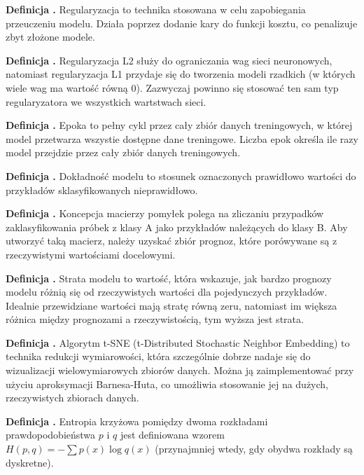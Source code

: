 \noindent
\textbf{Definicja .}
\incrementdefinitionIndex
Regularyzacja to technika stosowana w celu zapobiegania przeuczeniu modelu.
Działa poprzez dodanie kary do funkcji kosztu, co penalizuje zbyt złożone modele.

\noindent
\textbf{Definicja .}
\incrementdefinitionIndex
Regularyzacja L2 służy do ograniczania wag sieci neuronowych,
natomiast regularyzacja L1 przydaje się do tworzenia modeli rzadkich (w których wiele wag ma wartość równą 0). 
Zazwyczaj powinno się stosować ten sam typ regularyzatora we wszystkich wartstwach sieci.

\noindent
\textbf{Definicja .}
\incrementdefinitionIndex
Epoka to pełny cykl przez cały zbiór danych treningowych, w której model przetwarza wszystie dostępne dane treningowe.
Liczba epok określa ile razy model przejdzie przez cały zbiór danych treningowych.

\noindent
\textbf{Definicja .}
\incrementdefinitionIndex
Dokładność modelu to stosunek oznaczonych prawidłowo wartości do przykładów sklasyfikowanych nieprawidłowo.

\noindent
\textbf{Definicja .}
\incrementdefinitionIndex
Koncepcja macierzy pomyłek polega na zliczaniu przypadków zaklasyfikowania próbek z klasy A jako przykładów należących do klasy B.
Aby utworzyć taką macierz, należy uzyskać zbiór prognoz, które porówywane są z rzeczywistymi wartościami docelowymi.

\noindent
\textbf{Definicja .}
\incrementdefinitionIndex
Strata modelu to wartość, która wskazuje,
jak bardzo prognozy modelu różnią się od rzeczywistych wartości dla pojedynczych przykładów.
Idealnie przewidziane wartości mają stratę równą zeru,
natomiast im większa różnica między prognozami a rzeczywistością, tym wyższa jest strata.

\noindent
\textbf{Definicja .}
\incrementdefinitionIndex
Algorytm t-SNE (t-Distributed Stochastic Neighbor Embedding) to technika redukcji wymiarowości,
która szczególnie dobrze nadaje się do wizualizacji wielowymiarowych zbiorów danych.
Można ją zaimplementować przy użyciu aproksymacji Barnesa-Huta,
co umożliwia stosowanie jej na dużych, rzeczywistych zbiorach danych.

\noindent
\textbf{Definicja .}
\incrementdefinitionIndex
Entropia krzyżowa pomiędzy dwoma rozkładami prawdopodobieństwa $p$ i $q$ jest definiowana wzorem
$H(p,q) = -\sum p(x) \log q(x) $ (przynajmniej wtedy, gdy obydwa rozkłady są dyskretne).


